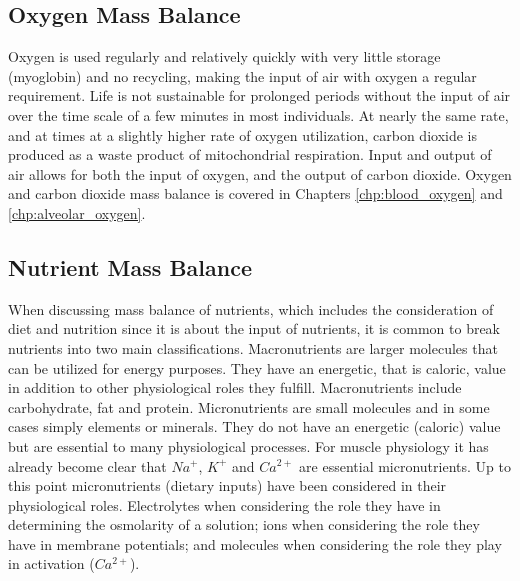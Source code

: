 \subsection{Oxygen Mass Balance}
Oxygen is used regularly and relatively quickly with very little storage (myoglobin) and no recycling, making the input of air with oxygen a regular requirement. Life is not sustainable for prolonged periods without the input of air over the time scale of a few minutes in most individuals. At nearly the same rate, and at times at a slightly higher rate of oxygen utilization, carbon dioxide is produced as a waste product of mitochondrial respiration. Input and output of air allows for both the input of oxygen, and the output of carbon dioxide. Oxygen and carbon dioxide mass balance is covered in Chapters \ref{chp:blood_oxygen} and \ref{chp:alveolar_oxygen}.

\subsection{Nutrient Mass Balance}

When discussing mass balance of nutrients, which includes the consideration of diet and nutrition since it is about the input of nutrients, it is common to break nutrients into two main classifications. Macronutrients are larger molecules that can be utilized for energy purposes. They have an energetic, that is caloric, value in addition to other physiological roles they fulfill. Macronutrients include carbohydrate, fat and protein. Micronutrients are small molecules and in some cases simply elements or minerals. They do not have an energetic (caloric) value but are essential to many physiological processes. For muscle physiology it has already become clear that $Na^+$, $K^+$ and $Ca^{2+}$ are essential micronutrients. Up to this point micronutrients (dietary inputs) have been considered in their physiological roles. Electrolytes when considering the role they have in determining the osmolarity of a solution; ions when considering the role they have in membrane potentials; and molecules when considering the role they play in activation ($Ca^{2+}$).

